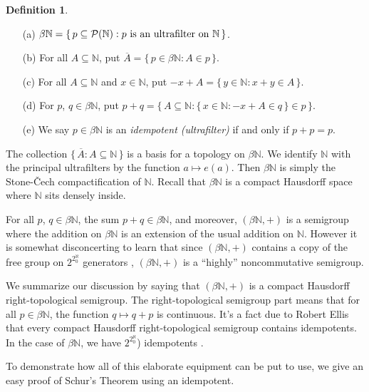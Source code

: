 \documentclass[12pt]{article}
\theoremstyle{plain}
\theoremstyle{definition}
\newtheorem{defn}[thm]{Definition}
\newcommand{\bbN}{\mathbb{N}}
\begin{document}
  \begin{defn}
    \label{defn:alg}
    \begin{itemize}
      \item[(a)] $\beta\bbN = \{\, p \subseteq \mathcal{P}(\bbN) :
        \hbox{$p$ is an ultrafilter on
        $\bbN$} \,\}$.
      \item[(b)] For all $A \subseteq \bbN$, put $\overline{A} = \{\,
        p \in \beta\bbN : A \in p \,\}$.
      \item[(c)] For all $A \subseteq \bbN$ and $x \in \bbN$, put
        $-x+A = \{\, y \in \bbN : x+y \in A \,\}$.
      \item[(d)] For $p$, $q \in \beta\bbN$, put
        $p+q = \bigl\{\, A \subseteq \bbN : \{\, x \in \bbN : -x +A \in q
        \,\} \in p \,\bigr\}$.
      \item[(e)] We say $p \in \beta\bbN$ is an \textsl{idempotent
          (ultrafilter)} if  and only if $p + p = p$.
    \end{itemize}
  \end{defn}

The collection $\{\, \overline{A} : A \subseteq \bbN \,\}$ is a
basis for a topology on $\beta\bbN$.
We identify $\bbN$ with the principal ultrafilters by the function
$a \mapsto e(a)$. Then $\beta\bbN$ is simply the Stone-\v{C}ech
compactification of $\bbN$. 
Recall that $\beta\bbN$ is a compact Hausdorff space where $\bbN$ sits
densely inside.  

For all $p$, $q \in \beta\bbN$, the sum $p+q \in \beta\bbN$, and moreover,
$(\beta\bbN, +)$ is a semigroup where the addition on $\beta\bbN$ is
an extension of the usual addition on $\bbN$. 
However it is somewhat disconcerting to learn that since $(\beta\bbN,
+)$ contains a copy of the free group on $2^{2^\aleph_0}$ generators
\cite[Corollary 7.36]{Hindman:1998fk}, $(\beta\bbN,+)$ is a ``highly''
noncommutative semigroup.


We summarize our discussion by saying that $(\beta\bbN,
+)$ is a compact Hausdorff right-topological semigroup. 
The right-topological semigroup part means that for all $p \in
\beta\bbN$, the function $q \mapsto q+p$ is continuous.
It's a fact due to Robert Ellis \cite[Corollary 2.10]{Ellis:1969zr}
that every compact Hausdorff right-topological semigroup contains
idempotents. 
In the case of $\beta\bbN$, we have 
$2^{2^\aleph_0}$) idempotents \cite[Theorem
6.44]{Hindman:1998fk}. 


To demonstrate how all of this elaborate equipment can be put to use,
we give an easy proof of Schur's Theorem using an idempotent.
\end{document}
